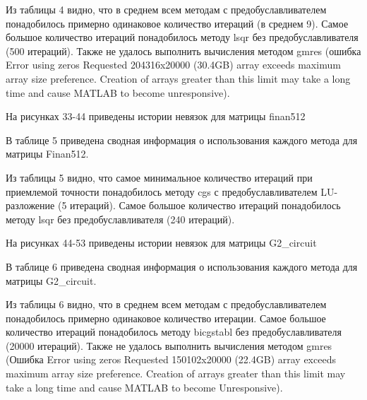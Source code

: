 

Из таблицы 4 видно, что в среднем всем методам с предобуславливателем понадобилось примерно одинаковое
количество итераций (в среднем 9).
Самое большое количество итераций понадобилось методу lsqr без предобуславливателя (500 итераций).
Также не удалось выполнить вычисления методом gmres (ошибка Error using zeros Requested 204316x20000 (30.4GB)
array exceeds maximum array size preference.
Creation of arrays greater than this limit may take a long time and cause MATLAB to become unresponsive).

На рисунках 33-44 приведены истории невязок для матрицы finan512



В таблице 5 приведена сводная информация о использования каждого метода для матрицы Finan512.



Из таблицы 5 видно, что самое минимальное количество итераций при
приемлемой точности понадобилось методу cgs с предобуславливателем LU-разложение (5 итераций).
Самое большое количество итераций понадобилось методу lsqr без предобуславливателя (240 итераций).

На рисунках 44-53 приведены истории невязок для матрицы G2_circuit



В таблице 6 приведена сводная информация о использования каждого метода для матрицы G2_circuit.



Из таблицы 6 видно, что в среднем всем методам с предобуславливателем понадобилось примерно одинаковое количество итерации.
Самое большое количество итераций понадобилось методу bicgstabl без предобуславливателя (20000 итераций).
Также не удалось выполнить вычисления методом gmres (Ошибка Error using zeros Requested 150102x20000 (22.4GB)
array exceeds maximum array size preference.
Creation of arrays greater than this limit may take a long time and cause MATLAB to become Unresponsive).